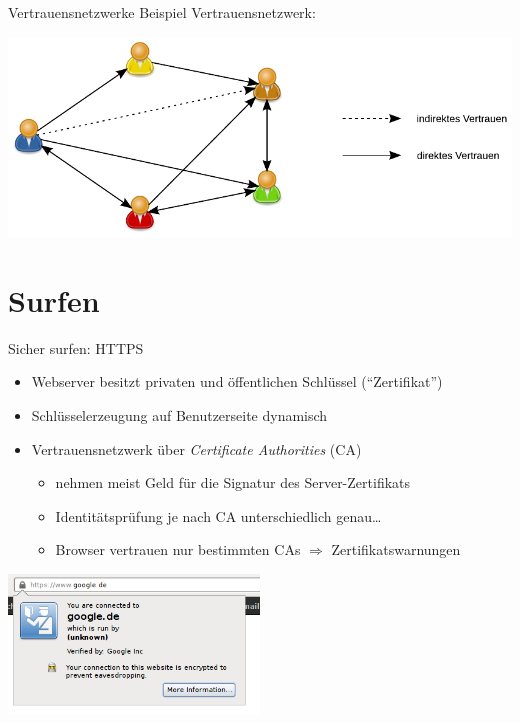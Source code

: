 \documentclass{beamer}
\begin{document}
\begin{frame}{Vertrauensnetzwerke}
Beispiel Vertrauensnetzwerk:
\begin{center}
	\includegraphics[width=\textwidth]{web-of-trust.pdf}
\end{center}
\end{frame}

\section{Surfen}
\begin{frame}{Sicher surfen: HTTPS}
\begin{itemize}
	\item Webserver besitzt privaten und öffentlichen Schlüssel ("`Zertifikat"')
	\item Schlüsselerzeugung auf Benutzerseite dynamisch
	\item Vertrauensnetzwerk über \emph{Certificate Authorities} (CA)
	\begin{itemize}
		\item nehmen meist Geld für die Signatur des Server-Zertifikats
		\item Identitätsprüfung je nach CA unterschiedlich genau\ldots
		\item Browser vertrauen nur bestimmten CAs $\Rightarrow$
			Zertifikatswarnungen
	\end{itemize}
\end{itemize}
\begin{center}
	\includegraphics[width=0.5\textwidth]{https-google-de.png}
\end{center}
\end{frame}
\end{document}
